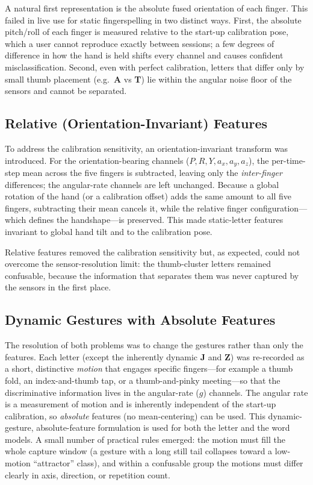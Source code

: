 A natural first representation is the absolute fused orientation of each finger.
This failed in live use for static fingerspelling in two distinct ways. First,
the absolute pitch/roll of each finger is measured relative to the start-up
calibration pose, which a user cannot reproduce exactly between sessions; a few
degrees of difference in how the hand is held shifts every channel and causes
confident misclassification. Second, even with perfect calibration, letters
that differ only by small thumb placement (e.g.\ \textbf{A} vs \textbf{T}) lie
within the angular noise floor of the sensors and cannot be separated.

\subsection{Relative (Orientation-Invariant) Features}

To address the calibration sensitivity, an orientation-invariant transform was
introduced. For the orientation-bearing channels ($P,R,Y,a_x,a_y,a_z$), the
per-time-step mean across the five fingers is subtracted, leaving only the
\emph{inter-finger} differences; the angular-rate channels are left unchanged.
Because a global rotation of the hand (or a calibration offset) adds the same
amount to all five fingers, subtracting their mean cancels it, while the
relative finger configuration—which defines the handshape—is preserved. This
made static-letter features invariant to global hand tilt and to the
calibration pose.

Relative features removed the calibration sensitivity but, as expected, could
not overcome the sensor-resolution limit: the thumb-cluster letters remained
confusable, because the information that separates them was never captured by
the sensors in the first place.

\subsection{Dynamic Gestures with Absolute Features}

The resolution of both problems was to change the gestures rather than only the
features. Each letter (except the inherently dynamic \textbf{J} and \textbf{Z})
was re-recorded as a short, distinctive \emph{motion} that engages specific
fingers—for example a thumb fold, an index-and-thumb tap, or a thumb-and-pinky
meeting—so that the discriminative information lives in the angular-rate
($g$) channels. The angular rate is a measurement of motion and is inherently
independent of the start-up calibration, so \emph{absolute} features (no
mean-centering) can be used. This dynamic-gesture, absolute-feature formulation
is used for both the letter and the word models. A small number of practical
rules emerged: the motion must fill the whole capture window (a gesture with a
long still tail collapses toward a low-motion ``attractor'' class), and within
a confusable group the motions must differ clearly in axis, direction, or
repetition count.

